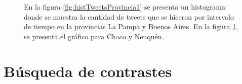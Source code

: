 \begin{figure}[!ht]
\begin {minipage}{0.49\textwidth}
     \caption{}
     \label{fig:histTweetsProvincia2}
   \end{minipage}
   \caption { En la figura \ref{fig:histTweetsProvincia1} se presenta un histograma donde se muestra la cantidad de tweets que se hiceron por intervalo de tiempo en la provincias La Pampa y Buenos Aires. En la figura \ref{fig:histTweetsProvincia2}, se presenta el gráfico para Chaco y Neuquén.}
\end{figure}




\section{Búsqueda de contrastes}

